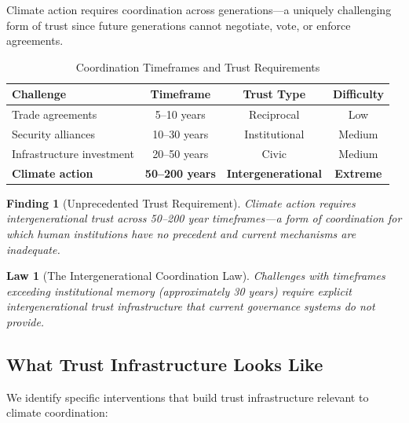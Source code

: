 \documentclass[12pt,a4paper]{article}
\newtheorem{finding}{Finding}
\newtheorem{law}{Law}
\begin{document}
Climate action requires coordination across generations---a uniquely challenging form of trust since future generations cannot negotiate, vote, or enforce agreements.

\begin{table}[H]
\centering
\caption{Coordination Timeframes and Trust Requirements}
\label{tab:intergenerational}
\begin{tabular}{lccc}
\toprule
\textbf{Challenge} & \textbf{Timeframe} & \textbf{Trust Type} & \textbf{Difficulty} \\
\midrule
Trade agreements & 5--10 years & Reciprocal & Low \\
Security alliances & 10--30 years & Institutional & Medium \\
Infrastructure investment & 20--50 years & Civic & Medium \\
\textbf{Climate action} & \textbf{50--200 years} & \textbf{Intergenerational} & \textbf{Extreme} \\
\bottomrule
\end{tabular}
\end{table}

\begin{finding}[Unprecedented Trust Requirement]
Climate action requires intergenerational trust across 50--200 year timeframes---a form of coordination for which human institutions have no precedent and current mechanisms are inadequate.
\end{finding}

\begin{law}[The Intergenerational Coordination Law]
Challenges with timeframes exceeding institutional memory (approximately 30 years) require explicit intergenerational trust infrastructure that current governance systems do not provide.
\end{law}

\subsection{What Trust Infrastructure Looks Like}

We identify specific interventions that build trust infrastructure relevant to climate coordination:
\end{document}
